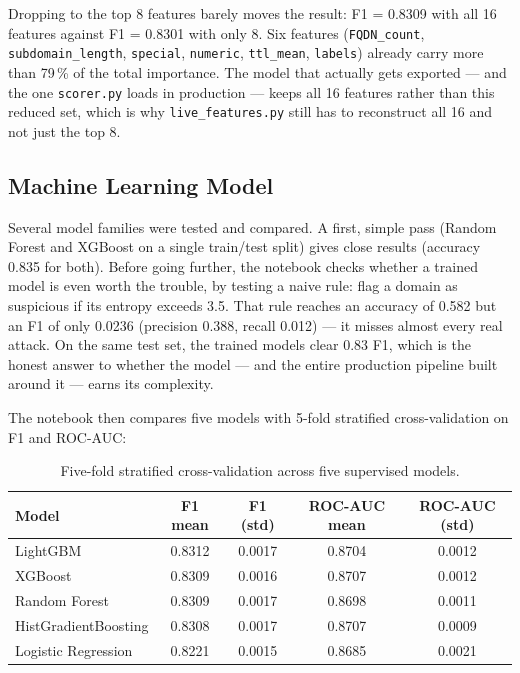 \documentclass[12pt,a4paper]{report}
\begin{document}
Dropping to the top 8 features barely moves the result: F1 = 0.8309 with all 16 features against F1 = 0.8301 with only 8. Six features (\texttt{FQDN\_count}, \texttt{subdomain\_length}, \texttt{special}, \texttt{numeric}, \texttt{ttl\_mean}, \texttt{labels}) already carry more than 79\,\% of the total importance. The model that actually gets exported --- and the one \texttt{scorer.py} loads in production --- keeps all 16 features rather than this reduced set, which is why \texttt{live\_features.py} still has to reconstruct all 16 and not just the top 8.

\subsection*{Machine Learning Model}
Several model families were tested and compared. A first, simple pass (Random Forest and XGBoost on a single train/test split) gives close results (accuracy 0.835 for both). Before going further, the notebook checks whether a trained model is even worth the trouble, by testing a naive rule: flag a domain as suspicious if its entropy exceeds 3.5. That rule reaches an accuracy of 0.582 but an F1 of only 0.0236 (precision 0.388, recall 0.012) --- it misses almost every real attack. On the same test set, the trained models clear 0.83 F1, which is the honest answer to whether the model --- and the entire production pipeline built around it --- earns its complexity.

The notebook then compares five models with 5-fold stratified cross-validation on F1 and ROC-AUC:

\begin{table}[h]
\centering
\small
\begin{tabular}{@{}lcccc@{}}
\toprule
\textbf{Model} & \textbf{F1 mean} & \textbf{F1 (std)} & \textbf{ROC-AUC mean} & \textbf{ROC-AUC (std)} \\
\midrule
LightGBM              & 0.8312 & 0.0017 & 0.8704 & 0.0012 \\
XGBoost                & 0.8309 & 0.0016 & 0.8707 & 0.0012 \\
Random Forest           & 0.8309 & 0.0017 & 0.8698 & 0.0011 \\
HistGradientBoosting    & 0.8308 & 0.0017 & 0.8707 & 0.0009 \\
Logistic Regression     & 0.8221 & 0.0015 & 0.8685 & 0.0021 \\
\bottomrule
\end{tabular}
\caption{Five-fold stratified cross-validation across five supervised models.}
\end{table}
\end{document}
